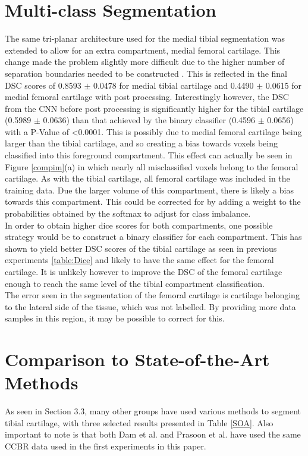 \documentclass[11pt,a4paper]{memoir}
\numberwithin{figure}{section}
\numberwithin{table}{section}
\numberwithin{equation}{section}
\begin{document}
\section{Multi-class Segmentation}
The same tri-planar architecture used for the medial tibial segmentation was extended to allow for an extra compartment, medial femoral cartilage. This change made the problem slightly more difficult due to the higher number of separation boundaries needed to be constructed \cite{Silla2006Time-SpaceClassification}. This is reflected in the final DSC scores of 0.8593 $\pm$ 0.0478 for medial tibial cartilage and 0.4490 $\pm$ 0.0615 for medial femoral cartilage with post processing. Interestingly however, the DSC from the CNN before post processing is significantly higher for the tibial cartilage (0.5989 $\pm$ 0.0636) than that achieved by the binary classifier (0.4596 $\pm$ 0.0656) with a P-Value of \textless 0.0001. This is possibly due to medial femoral cartilage being larger than the tibial cartilage, and so creating a bias towards voxels being classified into this foreground compartment. This effect can actually be seen in Figure \ref{compim}(a) in which nearly all misclassified voxels belong to the femoral cartilage. As with the tibial cartilage, all femoral cartilage was included in the training data. Due the larger volume of this compartment, there is likely a bias towards this compartment. This could be corrected for by adding a weight to the probabilities obtained by the softmax to adjust for class imbalance.\\

In order to obtain higher dice scores for both compartments, one possible strategy would be to construct a binary classifier for each compartment. This has shown to yield better DSC scores of the tibial cartilage as seen in previous experiments \ref{table:Dice} and likely to have the same effect for the femoral cartilage. It is unlikely however to improve the DSC of the femoral cartilage enough to reach the same level of the tibial compartment classification. \\

The error seen in the segmentation of the femoral cartilage is cartilage belonging to the lateral side of the tissue, which was not labelled. By providing more data samples in this region, it may be possible to correct for this. 


\section{Comparison to State-of-the-Art Methods}
As seen in Section 3.3, many other groups have used various methods to segment tibial cartilage, with three selected results presented in Table \ref{SOA}. Also important to note is that both Dam et al. and Prasoon et al. have used the same CCBR data used in the first experiments in this paper. \\
\end{document}
